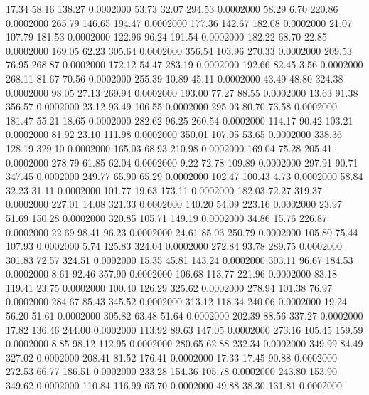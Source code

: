   17.34   58.16  138.27   0.0002000
  53.73   32.07  294.53   0.0002000
  58.29    6.70  220.86   0.0002000
 265.79  146.65  194.47   0.0002000
 177.36  142.67  182.08   0.0002000
  21.07  107.79  181.53   0.0002000
 122.96   96.24  191.54   0.0002000
 182.22   68.70   22.85   0.0002000
 169.05   62.23  305.64   0.0002000
 356.54  103.96  270.33   0.0002000
 209.53   76.95  268.87   0.0002000
 172.12   54.47  283.19   0.0002000
 192.66   82.45    3.56   0.0002000
 268.11   81.67   70.56   0.0002000
 255.39   10.89   45.11   0.0002000
  43.49   48.80  324.38   0.0002000
  98.05   27.13  269.94   0.0002000
 193.00   77.27   88.55   0.0002000
  13.63   91.38  356.57   0.0002000
  23.12   93.49  106.55   0.0002000
 295.03   80.70   73.58   0.0002000
 181.47   55.21   18.65   0.0002000
 282.62   96.25  260.54   0.0002000
 114.17   90.42  103.21   0.0002000
  81.92   23.10  111.98   0.0002000
 350.01  107.05   53.65   0.0002000
 338.36  128.19  329.10   0.0002000
 165.03   68.93  210.98   0.0002000
 169.04   75.28  205.41   0.0002000
 278.79   61.85   62.04   0.0002000
   9.22   72.78  109.89   0.0002000
 297.91   90.71  347.45   0.0002000
 249.77   65.90   65.29   0.0002000
 102.47  100.43    4.73   0.0002000
  58.84   32.23   31.11   0.0002000
 101.77   19.63  173.11   0.0002000
 182.03   72.27  319.37   0.0002000
 227.01   14.08  321.33   0.0002000
 140.20   54.09  223.16   0.0002000
  23.97   51.69  150.28   0.0002000
 320.85  105.71  149.19   0.0002000
  34.86   15.76  226.87   0.0002000
  22.69   98.41   96.23   0.0002000
  24.61   85.03  250.79   0.0002000
 105.80   75.44  107.93   0.0002000
   5.74  125.83  324.04   0.0002000
 272.84   93.78  289.75   0.0002000
 301.83   72.57  324.51   0.0002000
  15.35   45.81  143.24   0.0002000
 303.11   96.67  184.53   0.0002000
   8.61   92.46  357.90   0.0002000
 106.68  113.77  221.96   0.0002000
  83.18  119.41   23.75   0.0002000
 100.40  126.29  325.62   0.0002000
 278.94  101.38   76.97   0.0002000
 284.67   85.43  345.52   0.0002000
 313.12  118.34  240.06   0.0002000
  19.24   56.20   51.61   0.0002000
 305.82   63.48   51.64   0.0002000
 202.39   88.56  337.27   0.0002000
  17.82  136.46  244.00   0.0002000
 113.92   89.63  147.05   0.0002000
 273.16  105.45  159.59   0.0002000
   8.85   98.12  112.95   0.0002000
 280.65   62.88  232.34   0.0002000
 349.99   84.49  327.02   0.0002000
 208.41   81.52  176.41   0.0002000
  17.33   17.45   90.88   0.0002000
 272.53   66.77  186.51   0.0002000
 233.28  154.36  105.78   0.0002000
 243.80  153.90  349.62   0.0002000
 110.84  116.99   65.70   0.0002000
  49.88   38.30  131.81   0.0002000

